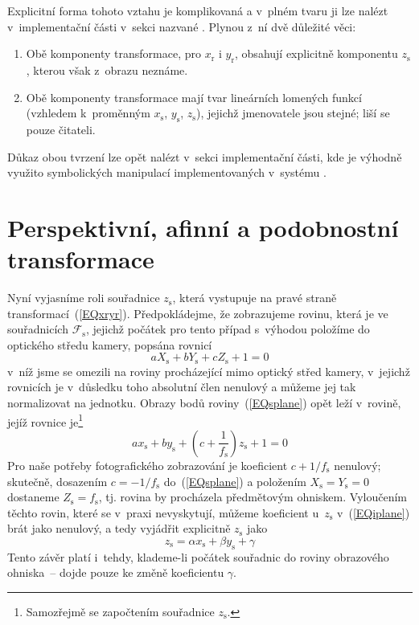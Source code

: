 Explicitní forma tohoto vztahu je komplikovaná a v~plném tvaru ji lze nalézt
v~implementační části v~sekci nazvané . Plynou z~ní dvě důležité věci:
\begin{enumerate}
\item Obě komponenty transformace, pro $x_{\mathrm{r}}$ i $y_{\mathrm{r}}$,
  obsahují explicitně komponentu $z_{\mathrm{s}}$, kterou však z~obrazu
  neznáme.
\item Obě komponenty transformace mají tvar lineárních lomených funkcí
  (vzhledem k~proměnným $x_{\mathrm{s}}$, $y_{\mathrm{s}}$, $z_{\mathrm{s}}$),
  jejichž jmenovatele jsou stejné; liší se pouze čitateli.
\end{enumerate}
Důkaz obou tvrzení lze opět nalézt v~sekci 
implementační části, kde je výhodně využito symbolických manipulací
implementovaných v~systému \Mma.

\section{Perspektivní, afinní a podobnostní transformace}\label{SECpafpo}%

Nyní vyjasníme roli  souřadnice $z_{\mathrm{s}}$, která
vystupuje na pravé straně transformací~(\ref{EQxryr}). Předpokládejme, že
zobrazujeme rovinu, která je ve  souřadnicích
$\mathcal{F}_{\mathrm{s}}$, jejichž počátek pro tento případ s~výhodou
položíme do optického středu kamery, popsána rovnicí
\begin{equation}
  aX_{\mathrm{s}} + bY_{\mathrm{s}} + cZ_{\mathrm{s}} + 1 = 0          \label{EQsplane}
\end{equation}
v~níž jsme se omezili na roviny procházející mimo optický střed kamery,
v~jejichž rovnicích je v~důsledku toho absolutní člen nenulový a můžeme jej
tak normalizovat na jednotku. Obrazy bodů roviny~(\ref{EQsplane}) opět leží
v~rovině, jejíž rovnice je\footnote{Samozřejmě se započtením 
  souřadnice $z_{\mathrm{s}}$.}
\begin{equation}
  ax_{\mathrm{s}}+by_{\mathrm{s}}
    +\left(c+\frac{1}{f_{\mathrm{s}}}\right)z_{\mathrm{s}}+1 = 0    \label{EQiplane}
\end{equation}
Pro naše potřeby fotografického zobrazování je koeficient $c+1/f_{\mathrm{s}}$
nenulový; skutečně, dosazením $c=-1/f_{\mathrm{s}}$ do~(\ref{EQsplane}) a
položením $X_{\mathrm{s}} = Y_{\mathrm{s}} = 0$ dostaneme $Z_{\mathrm{s}} =
f_{\mathrm{s}}$, tj. rovina by procházela předmětovým ohniskem. Vyloučením
těchto rovin, které se v~praxi nevyskytují, můžeme koeficient
u~$z_{\mathrm{s}}$ v~(\ref{EQiplane}) brát jako nenulový, a tedy vyjádřit
explicitně $z_{\mathrm{s}}$ jako
\begin{equation}
  z_{\mathrm{s}} = \alpha x_{\mathrm{s}} + \beta y_{\mathrm{s}} + \gamma  \label{EQabg}
\end{equation}
Tento závěr platí i~tehdy, klademe-li počátek souřadnic do roviny obrazového
ohniska~-- dojde pouze ke změně koeficientu $\gamma$.


